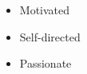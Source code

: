 %
%
%

\twocolumnsection
{
\begin{skills}
\end{skills}}
{
\vspace{1em}
\begin{itemize}
	\item Motivated
	\item Self-directed                    
    \item Passionate
\end{itemize}
}
